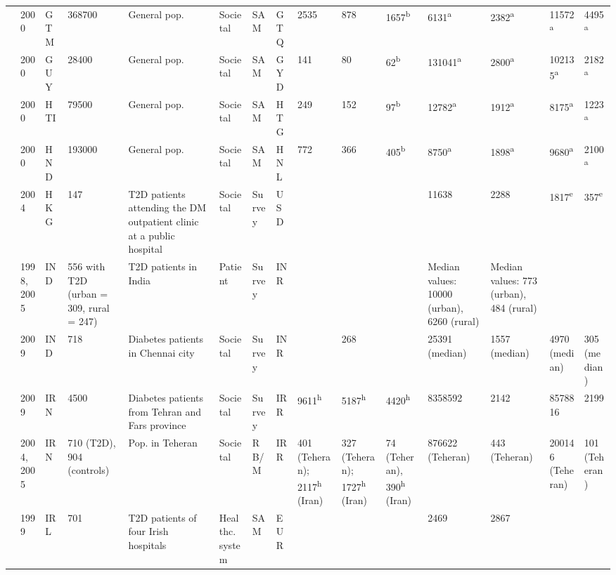{\begin{landscape}
\begin{tabularx}{\linewidth}{Z X X Z Z X X X X X X X X Y Y}
\textcite{Barcelo2003} & 2000 & GTM & 368700 & General pop. & Societal & SAM & GTQ & 2535 & 878 & 1657\textsuperscript{b} & 6131\textsuperscript{a} & 2382\textsuperscript{a} & 11572\textsuperscript{a} & 4495\textsuperscript{a} \\
\textcite{Barcelo2003} & 2000 & GUY & 28400 & General pop. & Societal & SAM & GYD & 141 & 80 & 62\textsuperscript{b} & 131041\textsuperscript{a} & 2800\textsuperscript{a} & 102135\textsuperscript{a} & 2182\textsuperscript{a} \\
\textcite{Barcelo2003} & 2000 & HTI & 79500 & General pop. & Societal & SAM & HTG & 249 & 152 & 97\textsuperscript{b} & 12782\textsuperscript{a} & 1912\textsuperscript{a} & 8175\textsuperscript{a} & 1223\textsuperscript{a} \\
\textcite{Barcelo2003} & 2000 & HND & 193000 & General pop. & Societal & SAM & HNL & 772 & 366 & 405\textsuperscript{b} & 8750\textsuperscript{a} & 1898\textsuperscript{a} & 9680\textsuperscript{a} & 2100\textsuperscript{a} \\
\textcite{Chan2007a} & 2004 & HKG & 147 & T2D patients attending the DM outpatient   clinic at a public hospital & Societal & Survey & USD &  &  &  & 11638 & 2288 & 1817\textsuperscript{e} & 357\textsuperscript{e} \\
\textcite{Ramachandran2007d} & 1998,  2005 & IND & 556 with T2D (urban = 309, rural = 247) & T2D patients in India & Patient & Survey & INR &  &  &  & Median values: 10000 (urban), 6260 (rural) & Median values: 773 (urban), 484 (rural) &  &  \\
\textcite{Tharkar2010a} & 2009 & IND & 718 & Diabetes patients in Chennai city & Societal & Survey & INR &  & 268 &  & 25391 (median) & 1557 (median) & 4970 (median) & 305 (median) \\
\textcite{Javanbakht2011b} & 2009 & IRN & 4500 & Diabetes patients from Tehran and Fars   province & Societal & Survey & IRR & 9611\textsuperscript{h} & 5187\textsuperscript{h} & 4420\textsuperscript{h} & 8358592 & 2142 & 8578816 & 2199 \\
\textcite{Esteghamati2009} & 2004, 2005 & IRN & 710 (T2D), 904 (controls) & Pop. in Teheran & Societal & RB/M & IRR & 401 (Teheran); 2117\textsuperscript{h}   (Iran) & 327 (Teheran); 1727\textsuperscript{h}   (Iran) & 74 (Teheran), 390\textsuperscript{h}   (Iran) & 876622 (Teheran) & 443 (Teheran) & 200146 (Teheran) & 101 (Teheran) \\
\textcite{Nolan2006c} & 1999 & IRL & 701 & T2D patients of   four Irish hospitals & Healthc. system & SAM & EUR &  &  &  & 2469 & 2867 &  &  \\

\end{tabularx}
\end{landscape}}
